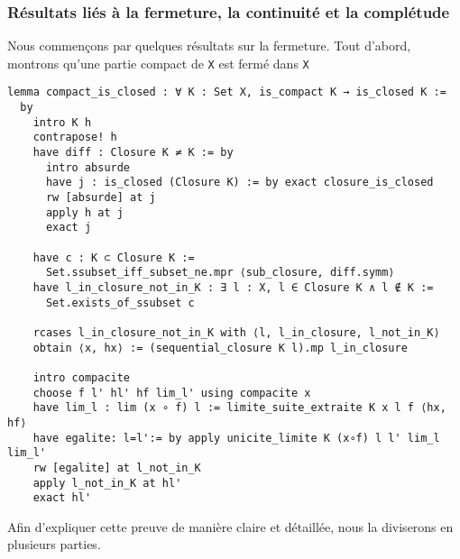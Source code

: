 \documentclass[a4paper, 12pt]{article}
\newcommand{\lean}[1]{\texttt{#1}}
\begin{document}
 \vspace{\baselineskip} 
 
\subsubsection{Résultats liés à la fermeture, la continuité et la complétude }


Nous commençons par quelques résultats sur la fermeture. Tout d'abord, montrons qu'une partie compact de \lean{X} est fermé dans \lean{X}

\begin{verbatim}   
lemma compact_is_closed : ∀ K : Set X, is_compact K → is_closed K := 
  by
    intro K h
    contrapose! h
    have diff : Closure K ≠ K := by
      intro absurde
      have j : is_closed (Closure K) := by exact closure_is_closed
      rw [absurde] at j
      apply h at j
      exact j

    have c : K ⊂ Closure K :=
      Set.ssubset_iff_subset_ne.mpr ⟨sub_closure, diff.symm⟩
    have l_in_closure_not_in_K : ∃ l : X, l ∈ Closure K ∧ l ∉ K :=
      Set.exists_of_ssubset c

    rcases l_in_closure_not_in_K with ⟨l, l_in_closure, l_not_in_K⟩
    obtain ⟨x, hx⟩ := (sequential_closure K l).mp l_in_closure

    intro compacite
    choose f l' hl' hf lim_l' using compacite x
    have lim_l : lim (x ∘ f) l := limite_suite_extraite K x l f ⟨hx, hf⟩
    have egalite: l=l':= by apply unicite_limite K (x∘f) l l' lim_l lim_l'
    rw [egalite] at l_not_in_K
    apply l_not_in_K at hl'
    exact hl'
\end{verbatim}

Afin d'expliquer cette preuve de manière claire et détaillée,  nous la diviserons en plusieurs parties.\\
\end{document}
